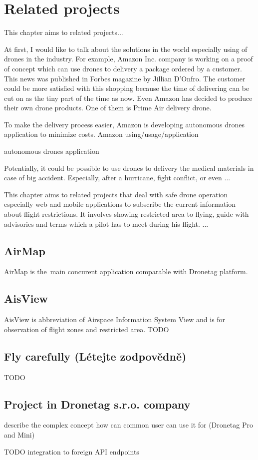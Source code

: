 \chapter{Related projects}\label{ch:related-projects}
This chapter aims to related projects...

At first, I would like to talk about the solutions in the world especially using of drones in the industry.
For example, Amazon Inc. company is working on a proof of concept which can use drones to delivery a package ordered by a customer.
This news was published in Forbes magazine by Jillian D'Onfro.\cite{amazonArticle}
The customer could be more satisfied with this shopping because the time of delivering can be cut on as the tiny part of the time as now.
Even Amazon has decided to produce their own drone products.
One of them is Prime Air delivery drone.

To make the delivery process easier, Amazon is developing autonomous drones application to minimize costs.
Amazon using/usage/application

autonomous drones application

Potentially, it could be possible to use drones to delivery the medical materials in case of big accident.
Especially, after a hurricane, fight conflict, or even ...


This chapter aims to related projects that deal with safe drone operation especially web and mobile applications to subscribe the current information about flight restrictions.
It involves showing restricted area to flying, guide with advisories and terms which a pilot has to meet during his flight.
...

\section{AirMap}\label{sec:airmap}
AirMap is the~main concurent application comparable with Dronetag platform.%

\section{AisView}\label{sec:aisview}
AisView is abbreviation of Airspace Information System View and is for observation of flight zones and restricted area.
TODO

\section{Fly carefully (L{\' e}tejte zodpov{\v e}dn{\v e})}\label{sec:fly-carefully}
TODO

\section{Project in Dronetag s.r.o. company}\label{sec:project-in-dronetag-s.r.o.-company}
describe the complex concept how can common user can use it for (Dronetag Pro and Mini)


TODO integration to foreign API endpoints

